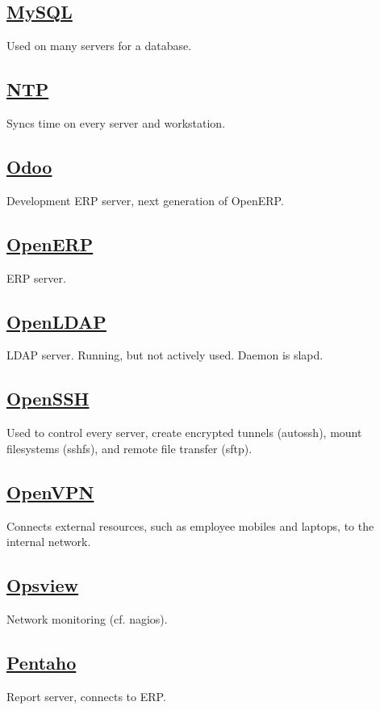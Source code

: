 \subsection{\href{http://www.mysql.org/}{MySQL}}
Used on many servers for a database.

\subsection{\href{http://support.ntp.org/}{NTP}}
Syncs time on every server and workstation.

\subsection{\href{http://www.odoo.com/}{Odoo}}
Development ERP server, next generation of OpenERP.

\subsection{\href{http://www.openerp.org/}{OpenERP}}
ERP server.

\subsection{\href{http://www.openldap.org/}{OpenLDAP}}
LDAP server. Running, but not actively used. Daemon is slapd.

\subsection{\href{http://www.openssh.com/}{OpenSSH}}
Used to control every server, create encrypted tunnels (autossh),
mount filesystems (sshfs), and remote file transfer (sftp).

\subsection{\href{http://openvpn.net/}{OpenVPN}}
Connects external resources, such as employee mobiles and laptops, to the internal network.

\subsection{\href{http://www.opsview.com/}{Opsview}}
Network monitoring (cf. nagios).

\subsection{\href{http://community.pentaho.com/}{Pentaho}}
Report server, connects to ERP.

